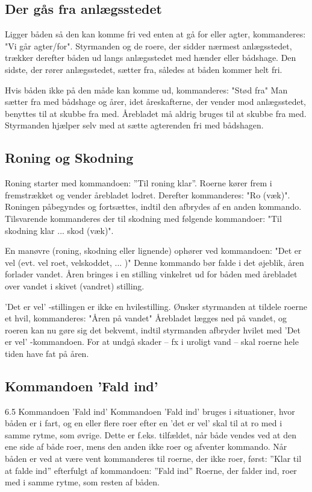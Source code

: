 \documentclass{article}
\begin{document}
\subsection{Der gås fra anlægsstedet}

Ligger båden så den kan komme fri ved enten at gå for eller agter,
kommanderes: "Vi går agter/for".  Styrmanden og de roere, der sidder
nærmest anlægsstedet, trækker derefter båden ud langs anlægsstedet med
hænder eller bådshage. Den sidste, der rører anlægsstedet, sætter fra,
således at båden kommer helt fri.

Hvis båden ikke på den måde kan komme ud, kommanderes: "Stød fra" Man
sætter fra med bådshage og årer, idet åreskafterne, der vender mod
anlægsstedet, benyttes til at skubbe fra med. Årebladet må aldrig bruges
til at skubbe fra med. Styrmanden hjælper selv med at sætte agterenden
fri med bådshagen.

\subsection{Roning og Skodning}

Roning starter med kommandoen: ”Til roning klar”.  Roerne kører frem i
fremstrækket og vender årebladet lodret.  Derefter kommanderes: "Ro
(væk)".  Roningen påbegyndes og fortsættes, indtil den afbrydes af en
anden kommando.  Tilsvarende kommanderes der til skodning med følgende
kommandoer: "Til skodning klar ... skod (væk)".

En manøvre (roning, skodning eller lignende) ophører ved kommandoen:
"Det er vel (evt. vel roet, velskoddet, ... )" Denne kommando bør falde i
det øjeblik, åren forlader vandet. Åren bringes i en stilling vinkelret
ud for båden med årebladet over vandet i skivet (vandret) stilling.

’Det er vel’ -stillingen er ikke en hvilestilling. Ønsker styrmanden at
tildele roerne et hvil, kommanderes: "Åren på vandet" Årebladet lægges
ned på vandet, og roeren kan nu gøre sig det bekvemt, indtil styrmanden
afbryder hvilet med ’Det er vel’ -kommandoen. For at undgå skader – fx i
uroligt vand – skal roerne hele tiden have fat på åren.

\subsection{Kommandoen ’Fald ind’}

6.5 Kommandoen ’Fald ind’ Kommandoen ’Fald ind’ bruges i situationer,
hvor båden er i fart, og en eller flere roer efter en ’det er vel’ skal
til at ro med i samme rytme, som øvrige. Dette er f.eks. tilfældet, når
både vendes ved at den ene side af både roer, mens den anden ikke roer og
afventer kommando. Når båden er ved at være vent kommanderes til roerne,
der ikke roer, først: ”Klar til at falde ind” efterfulgt af kommandoen:
”Fald ind” Roerne, der falder ind, roer med i samme rytme, som resten af
båden.
\end{document}
